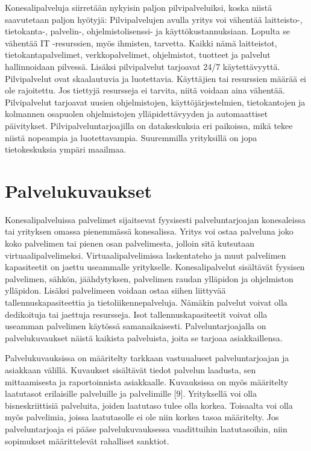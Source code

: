 Konesalipalveluja siirretään nykyisin paljon pilvipalveluiksi, koska niistä saavutetaan paljon hyötyjä: Pilvipalvelujen avulla yritys voi vähentää laitteisto-, tietokanta-, palvelin-, ohjelmistolisenssi- ja käyttökustannuksiaan. Lopulta se vähentää IT -resurssien, myös ihmisten, tarvetta. Kaikki nämä laitteistot, tietokantapalvelimet, verkkopalvelimet, ohjelmistot, tuotteet ja palvelut hallinnoidaan pilvessä. Lisäksi pilvipalvelut tarjoavat 24/7 käytettävyyttä. Pilvipalvelut ovat skaalautuvia ja luotettavia. Käyttäjien tai resurssien määrää ei ole rajoitettu. Jos tiettyjä resursseja ei tarvita, niitä voidaan aina vähentää. Pilvipalvelut tarjoavat uusien ohjelmistojen, käyttöjärjestelmien, tietokantojen ja kolmannen osapuolen ohjelmistojen ylläpidettävyyden ja automaattiset päivitykset. Pilvipalveluntarjoajilla on datakeskuksia eri paikoissa, mikä tekee niistä nopeampia ja luotettavampia. Suuremmilla yrityksillä on jopa tietokeskuksia ympäri maailmaa. \citep{top_cloud}

\section{Palvelukuvaukset}
Konesalipalveluissa palvelimet sijaitsevat fyysisesti palveluntarjoajan konesaleissa tai yrityksen omassa pienemmässä konesalissa. Yritys voi ostaa palveluna joko koko palvelimen tai pienen osan palvelimesta, jolloin sitä kutsutaan virtuaalipalvelimeksi. Virtuaalipalvelimissa laskentateho ja muut palvelimen kapasiteetit on jaettu useammalle yritykselle. Konesalipalvelut sisältävät fyysisen palvelimen, sähkön, jäähdytyksen, palvelimen raudan ylläpidon ja ohjelmiston ylläpidon. Lisäksi palvelimeen voidaan ostaa siihen liittyvää tallennuskapasiteettia ja tietoliikennepalveluja. Nämäkin palvelut voivat olla dedikoituja tai jaettuja resursseja. Isot tallennuskapasiteetit voivat olla useamman palvelimen käytössä samanaikaisesti. Palveluntarjoajalla on palvelukuvaukset näistä kaikista palveluista, joita se tarjoaa asiakkaillensa. \citep{handbook}

Palvelukuvauksissa on määritelty tarkkaan vastuualueet palveluntarjoajan ja asiakkaan välillä. Kuvaukset sisältävät tiedot palvelun laadusta, sen mittaamisesta ja raportoinnista asiakkaalle. Kuvauksissa on myös määritelty laatutasot erilaisille palveluille ja palvelimille [9]. Yrityksellä voi olla bisneskriittisiä palveluita, joiden laatutaso tulee olla korkea. Toisaalta voi olla myös palvelimia, joissa laatutasolle ei ole niin korkea tasoa määritelty. Jos palveluntarjoaja ei pääse palvelukuvauksessa vaadittuihin laatutasoihin, niin sopimukset määrittelevät rahalliset sanktiot.

